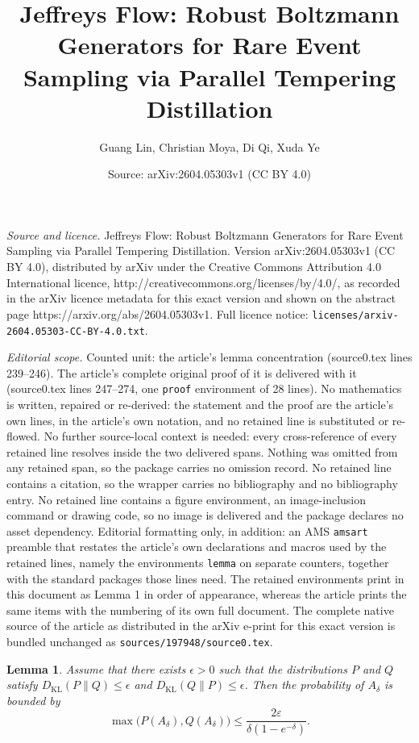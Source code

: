 \documentclass[10pt,a4paper]{amsart}
\title{Jeffreys Flow: Robust Boltzmann Generators for Rare Event Sampling via Parallel Tempering Distillation}
\author{Guang Lin, Christian Moya, Di Qi, Xuda Ye}
\date{Source: arXiv:2604.05303v1 (CC BY 4.0)}
\newtheorem{lemma}{Lemma}
\DeclareMathOperator{\KL}{KL}
\newcommand{\Le}{\leqslant}
\newcommand{\ep}{\varepsilon}
\begin{document}
\maketitle

\noindent\emph{Source and licence.} Jeffreys Flow: Robust Boltzmann Generators for Rare Event Sampling via Parallel Tempering Distillation. Version arXiv:2604.05303v1 (CC BY 4.0), distributed by arXiv under the Creative Commons Attribution 4.0 International licence, http://creativecommons.org/licenses/by/4.0/, as recorded in the arXiv licence metadata for this exact version and shown on the abstract page https://arxiv.org/abs/2604.05303v1. Full licence notice: \texttt{licenses/arxiv-2604.05303-CC-BY-4.0.txt}.\par\smallskip

\noindent\textit{Editorial scope.} Counted unit: the article's lemma concentration (source0.tex lines 239--246). The article's complete original proof of it is delivered with it (source0.tex lines 247--274, one \texttt{proof} environment of 28 lines). No mathematics is written, repaired or re-derived: the statement and the proof are the article's own lines, in the article's own notation, and no retained line is substituted or re-flowed.  No further source-local context is needed: every cross-reference of every retained line resolves inside the two delivered spans.  Nothing was omitted from any retained span, so the package carries no omission record.  No retained line contains a citation, so the wrapper carries no bibliography and no bibliography entry.  No retained line contains a figure environment, an image-inclusion command or drawing code, so no image is delivered and the package declares no asset dependency.  Editorial formatting only, in addition: an AMS \texttt{amsart} preamble that restates the article's own declarations and macros used by the retained lines, namely the environments \texttt{lemma} on separate counters, together with the standard packages those lines need.  The retained environments print in this document as Lemma 1 in order of appearance, whereas the article prints the same items with the numbering of its own full document.  The complete native source of the article as distributed in the arXiv e-print for this exact version is bundled unchanged as \texttt{sources/197948/source0.tex}.
\begin{lemma}
	\label{lemma: concentration}
	Assume that there exists $\epsilon>0$ such that the distributions $P$ and $Q$ satisfy $D_{\KL}(P\|Q) \Le \epsilon$ and $D_{\KL}(Q\|P) \Le \epsilon$. Then the probability of $A_\delta$ is bounded by
	\begin{equation}
		\max\big(P(A_\delta),Q(A_\delta)\big) \Le \frac{2\ep}{\delta(1-e^{-\delta})}.
		\label{eq: mPQb}
	\end{equation}
\end{lemma}
\end{document}
